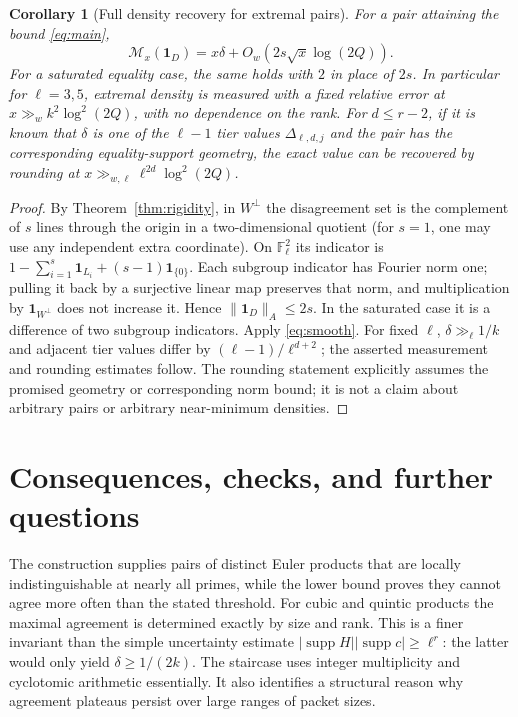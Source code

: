 \documentclass[11pt]{article}
\newtheorem{corollary}[theorem]{Corollary}
\theoremstyle{remark}\newtheorem{remark}[theorem]{Remark}
\newcommand{\F}{\mathbb F}
\newcommand{\supp}{\operatorname{supp}}
\newcommand{\abs}[1]{\lvert#1\rvert}
\newcommand{\norm}[1]{\lVert#1\rVert}
\newcommand{\ind}{\mathbf 1}
\begin{document}
\begin{corollary}[Full density recovery for extremal pairs]\label{cor:measure}
For a pair attaining the bound \eqref{eq:main},
\[
 \mathcal M_x(\ind_D)=x\delta+O_w(2s\sqrt x\log(2Q)).
\]
For a saturated equality case, the same holds with $2$ in place of $2s$. In particular for $\ell=3,5$, extremal density is measured with a fixed relative error at $x\gg_w k^2\log^2(2Q)$, with no dependence on the rank. For $d\le r-2$, if it is known that $\delta$ is one of the $\ell-1$ tier values $\Delta_{\ell,d,j}$ and the pair has the corresponding equality-support geometry, the exact value can be recovered by rounding at $x\gg_{w,\ell} \ell^{2d}\log^2(2Q)$.
\end{corollary}
\begin{proof}
By Theorem~\ref{thm:rigidity}, in $W^\perp$ the disagreement set is the complement of $s$ lines through the origin in a two-dimensional quotient (for $s=1$, one may use any independent extra coordinate). On $\F_\ell^2$ its indicator is $1-\sum_{i=1}^s\ind_{L_i}+(s-1)\ind_{\{0\}}$. Each subgroup indicator has Fourier norm one; pulling it back by a surjective linear map preserves that norm, and multiplication by $\ind_{W^\perp}$ does not increase it. Hence $\norm{\ind_D}_A\le2s$. In the saturated case it is a difference of two subgroup indicators. Apply \eqref{eq:smooth}. For fixed $\ell$, $\delta\gg_\ell1/k$ and adjacent tier values differ by $(\ell-1)/\ell^{d+2}$; the asserted measurement and rounding estimates follow. The rounding statement explicitly assumes the promised geometry or corresponding norm bound; it is not a claim about arbitrary pairs or arbitrary near-minimum densities.
\end{proof}

\section{Consequences, checks, and further questions}
The construction supplies pairs of distinct Euler products that are locally indistinguishable at nearly all primes, while the lower bound proves they cannot agree more often than the stated threshold. For cubic and quintic products the maximal agreement is determined exactly by size and rank. This is a finer invariant than the simple uncertainty estimate $\abs{\supp H}\abs{\supp c}\ge\ell^r$: the latter would only yield $\delta\ge1/(2k)$. The staircase uses integer multiplicity and cyclotomic arithmetic essentially. It also identifies a structural reason why agreement plateaus persist over large ranges of packet sizes.
\end{document}
